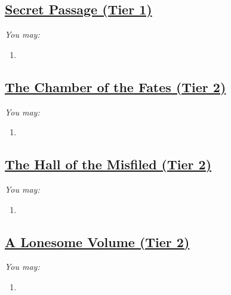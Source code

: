 \documentclass[sheet]{GL2020}
\begin{document}
\clearpage

\begin{center}\section*{\underline{Secret Passage (Tier 1)}}\end{center}
\label{SecretPassage}

\begingroup
\itshape
You may:
\begin{enumerate}[A]
  \item 
\end{enumerate}
\endgroup

\clearpage

\begin{center}\section*{\underline{The Chamber of the Fates (Tier 2)}}\end{center}
\label{ChamberoftheFates}

\begingroup
\itshape
You may:
\begin{enumerate}[A]
  \item 
\end{enumerate}
\endgroup

\clearpage

\begin{center}\section*{\underline{The Hall of the Misfiled (Tier 2)}}\end{center}
\label{HallMisfiled}

\begingroup
\itshape
You may:
\begin{enumerate}[A]
  \item 
\end{enumerate}
\endgroup

\clearpage

\begin{center}\section*{\underline{A Lonesome Volume (Tier 2)}}\end{center}
\label{LonesomeVolume}

\begingroup
\itshape
You may:
\begin{enumerate}[A]
  \item 
\end{enumerate}
\endgroup
\end{document}
